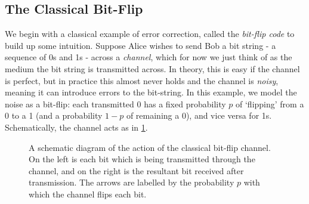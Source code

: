 \documentclass[12pt,a4paper]{report}
\numberwithin{equation}{section}
\theoremstyle{definition}
\theoremstyle{theorem}
\theoremstyle{theorem}
\theoremstyle{example}
\theoremstyle{definition}
\begin{document}
\subsection{The Classical Bit-Flip}
We begin with a classical example of error correction, called the \textit{bit-flip code} to build up some intuition. Suppose Alice wishes to send Bob a bit string - a sequence of 0s and 1s - across a \textit{channel}, which for now we just think of as the medium the bit string is transmitted across. In theory, this is easy if the channel is perfect, but in practice this almost never holds and the channel is \textit{noisy}, meaning it can introduce errors to the bit-string. In this example, we model the noise as a bit-flip: each transmitted 0 has a fixed probability $p$ of `flipping' from a 0 to a 1 (and a probability $1-p$ of remaining a 0), and vice versa for 1s. Schematically, the channel acts as in \ref{ClassBitFlip}.

\begin{figure}
	\centering
	\caption{A schematic diagram of the action of the classical bit-flip channel. On the left is each bit which is being transmitted through the channel, and on the right is the resultant bit received after transmission. The arrows are labelled by the probability $p$ with which the channel flips each bit.}
	\label{ClassBitFlip}
\end{figure}
\end{document}
